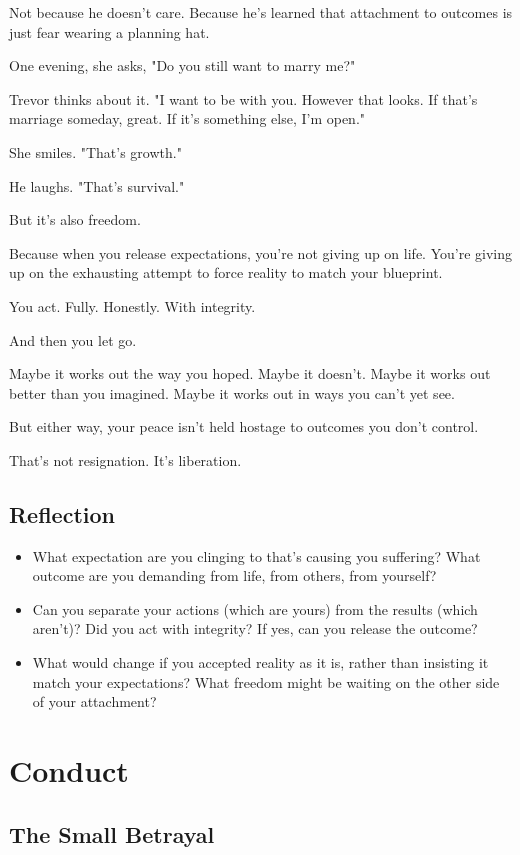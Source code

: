 \documentclass[11pt,twoside]{book}
\begin{document}
Not because he doesn't care. Because he's learned that attachment to outcomes is just fear wearing a planning hat.

One evening, she asks, "Do you still want to marry me?"

Trevor thinks about it. "I want to be with you. However that looks. If that's marriage someday, great. If it's something else, I'm open."

She smiles. "That's growth."

He laughs. "That's survival."

But it's also freedom.

Because when you release expectations, you're not giving up on life. You're giving up on the exhausting attempt to force reality to match your blueprint.

You act. Fully. Honestly. With integrity.

And then you let go.

Maybe it works out the way you hoped. Maybe it doesn't. Maybe it works out better than you imagined. Maybe it works out in ways you can't yet see.

But either way, your peace isn't held hostage to outcomes you don't control.

That's not resignation. It's liberation.

\section*{Reflection}

\begin{itemize}
\item What expectation are you clinging to that's causing you suffering? What outcome are you demanding from life, from others, from yourself?
\item Can you separate your actions (which are yours) from the results (which aren't)? Did you act with integrity? If yes, can you release the outcome?
\item What would change if you accepted reality as it is, rather than insisting it match your expectations? What freedom might be waiting on the other side of your attachment?
\end{itemize}

\chapter{Conduct}

\section*{The Small Betrayal}
\end{document}
